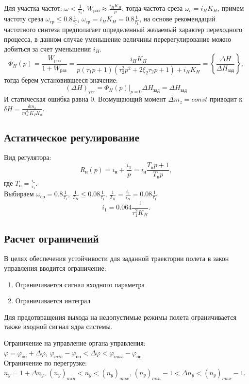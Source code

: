 \documentclass{article}
\begin{document}
Для участка частот:
$\omega < \frac{1}{\tau_1}$, $W_\text{раз} \approx \frac{i_H K_H }{p} $, тогда
частота среза $\omega_c = i_H  K_H$, примем частоту среза $\omega_\text{ср} \le
	0.8 \frac{1}{\tau_1}$, $\omega_\text{ср} = i_H K_H =0.8 \frac{1}{\tau_1} $, на
основе рекомендаций частотного синтеза предполагает определенный желаемый
характер переходного процесса, в данном случае уменьшение величины
перерегулирование можно добиться за счет уменьшения $i_H$.
\[
	\Phi_H (p) =\frac{W_\text{раз}}{1 + W_\text{раз}} =\frac{i_H K_H}{p(\tau_1
		p +1)(\tau_2^2 p^2 + 2 \xi_2 \tau_2 p + 1) + i_H K_H} = \left\{
	\frac{\Delta H}{\Delta H_\text{зад}} \right\},
\]
тогда берем установившееся значение:
\[
	(\Delta H)_\text{уст} = \Phi_H(p)|_{p=0} \Delta H_\text{зад} = \Delta
	H_\text{зад}
\]
И статическая ошибка равна 0. Возмущающий момент $\Delta m_z = const$ приводит
к $\delta H =\frac{\delta m_z}{m_z^{\delta_\text{н}} K_\vartheta K_\text{н}}$.

\subsection{Астатическое регулирование}
Вид регулятора:
\[
	R_\text{н}(p) = i_\text{н} +\frac{i_1}{p}  = i_\text{н} \frac{T_\text{н} p
		+ 1}{T_\text{н} p},
\]
где $T_\text{н} =\frac{i_\text{н}}{i_1}$.\\
Выбираем $\omega_\text{ср} = 0.8 \frac{1}{\tau_1}$, $\frac{1}{T_H} \le
	0.08\frac{1}{\tau_1}$, $\frac{1}{T_H} = \frac{i_1}{i_H} = 0.08\frac{1}{\tau_1}$
\[
	i_1 = 0.064 \frac{1}{\tau_1^2 K_H}
	.\]

\subsection{Расчет ограничений}
В целях обеспечения устойчивости для заданной траектории полета в закон
управления вводится ограничение:
\begin{enumerate}
	\item Ограничивается сигнал входного параметра
	\item Ограничивается интеграл
\end{enumerate}

Для предотвращения выхода на недопустимые режимы полета ограничивается также
входной сигнал ядра системы.
\begin{figure}[H]
	\centering
	\label{fig:fig_54}
\end{figure}

Ограничение на управление органа управления:\\
$\varphi = \varphi_\text{оп} + \Delta \varphi$, $\varphi_{min} -
	\varphi_\text{оп} < \Delta \varphi < \varphi_{max} - \varphi_\text{оп}$\\
Ограничение по перегрузке:\\
$n_y = 1 + \Delta n_y$, $(n_y)_{min} < n_y < (n_y)_{max}$, $(n_y)_{min} - 1 <
	\Delta n_y < (n_y)_{max} - 1$.
\end{document}

